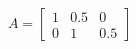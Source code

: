 \documentclass[preview]{standalone}
\begin{document}
\begin{align*}
A = \begin{bmatrix} 1 & 0.5 & 0 \\ 0 & 1 & 0.5 \end{bmatrix}
\end{align*}
\end{document}

